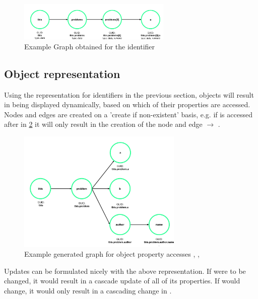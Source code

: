 \begin{figure}[H]
    \centering
    \includegraphics[width=0.65\textwidth]{images/graph_simple.png}
     \caption{Example Graph obtained for the identifier  }
     \label{fig:graph_simple}
\end{figure}

\subsection{Object representation}
Using the representation for identifiers in the previous section, objects will result in being displayed dynamically, based on which of their properties are accessed. Nodes and edges are created on a 'create if non-existent' basis, e.g. if  is accessed after  in \ref{fig:graph_object} it will only result in the creation of the node  and edge  $\rightarrow$  .

\begin{figure}[H]
    \centering
    \includegraphics[width=0.7\textwidth]{images/graph_object.png}
     \caption{Example generated graph for object property accesses , ,   }
     \label{fig:graph_object}
\end{figure}

Updates can be formulated nicely with the above representation. If  were to be changed, it would result in a cascade update of all of its properties. If  would change, it would only result in a cascading change in . 

